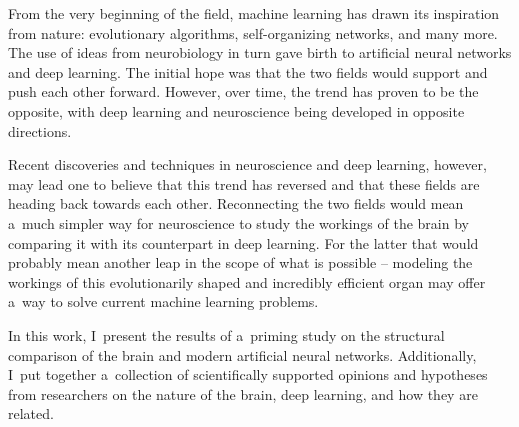 \begin{abstract-en}
    From the very beginning of the field, machine learning has drawn its inspiration from nature: evolutionary algorithms, self-organizing networks, and many more.
    The use of ideas from neurobiology in turn gave birth to artificial neural networks and deep learning.
    The initial hope was that the two fields would support and push each other forward.
    However, over time, the trend has proven to be the opposite, with deep learning and neuroscience being developed in opposite directions.

    Recent discoveries and techniques in neuroscience and deep learning, however, may lead one to believe that this trend has reversed and that these fields are heading back towards each other.
    Reconnecting the two fields would mean a~much simpler way for neuroscience to study the workings of the brain by comparing it with its counterpart in deep learning.
    For the latter that would probably mean another leap in the scope of what is possible -- modeling the workings of this evolutionarily shaped and incredibly efficient organ may offer a~way to solve current machine learning problems.

    In this work, I~present the results of a~priming study on the structural comparison of the brain and modern artificial neural networks.
    Additionally, I~put together a~collection of scientifically supported opinions and hypotheses from researchers on the nature of the brain, deep learning, and how they are related.
\end{abstract-en}